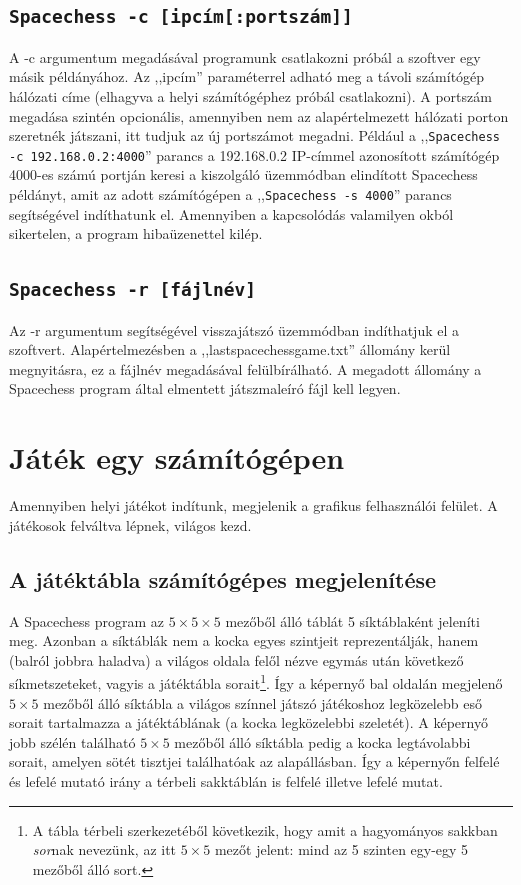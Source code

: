 \documentclass[12pt, twoside]{report}
\begin{document}
\subsection*{\tt Spacechess -c [ipcím[:portszám]]}
A -c argumentum megadásával programunk csatlakozni próbál a szoftver egy másik példányához. Az ,,ipcím'' paraméterrel adható meg a távoli számítógép hálózati címe (elhagyva a helyi számítógéphez próbál csatlakozni). A portszám megadása szintén opcionális, amennyiben nem az alapértelmezett hálózati porton szeretnék játszani, itt tudjuk az új portszámot megadni. Például a ,,{\tt Spacechess -c 192.168.0.2:4000}'' parancs a 192.168.0.2 IP-címmel azonosított számítógép 4000-es számú portján keresi a kiszolgáló üzemmódban elindított Spacechess példányt, amit az adott számítógépen a ,,{\tt Spacechess -s 4000}'' parancs segítségével indíthatunk el. Amennyiben a kapcsolódás valamilyen okból sikertelen, a program hibaüzenettel kilép.
\subsection*{\tt Spacechess -r [fájlnév]}
Az -r argumentum segítségével visszajátszó üzemmódban indíthatjuk el a szoftvert. Alapértelmezésben a ,,lastspacechessgame.txt'' állomány kerül megnyitásra, ez a fájlnév megadásával felülbírálható. A megadott állomány a Spacechess program által elmentett játszmaleíró fájl kell legyen.


\section{Játék egy számítógépen}

Amennyiben helyi játékot indítunk, megjelenik a grafikus felhasználói felület. A já\-té\-ko\-sok felváltva lépnek, világos kezd. 

\subsection{A játéktábla számítógépes megjelenítése}

A Spacechess program az $ 5 \times 5 \times 5 $ mezőből álló táblát 5 síktáblaként jeleníti meg. Azonban a síktáblák nem a kocka egyes szintjeit reprezentálják, hanem (balról jobbra haladva) a világos oldala felől nézve egymás után következő síkmetszeteket, vagyis a játéktábla sorait\footnote{A tábla térbeli szerkezetéből következik, hogy amit a hagyományos sakkban \textit{sor}nak nevezünk, az itt $ 5 \times 5 $ mezőt jelent: mind az 5 szinten egy-egy 5 mezőből álló sort.}. Így a képernyő bal oldalán megjelenő $ 5 \times 5 $ mezőből álló síktábla a világos színnel játszó játékoshoz legközelebb eső sorait tartalmazza a játéktáblának (a kocka legközelebbi szeletét). A képernyő jobb szélén található $ 5 \times 5 $ mezőből álló síktábla pedig a kocka legtávolabbi sorait, amelyen sötét tisztjei találhatóak az alapállásban. Így a képernyőn felfelé és lefelé mutató irány a térbeli sakktáblán is felfelé illetve lefelé mutat. 
\end{document}
